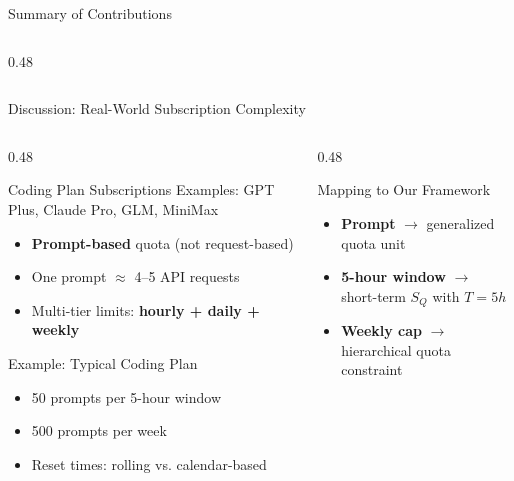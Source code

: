 \documentclass[aspectratio=169,10pt]{beamer}
\begin{document}
\begin{frame}{Summary of Contributions}
\begin{columns}[T]
\begin{column}{0.48\textwidth}
\vspace{0.3cm}
\centering
{}
\end{column}
\end{columns}
\end{frame}

\begin{frame}{Discussion: Real-World Subscription Complexity}
\begin{columns}[T]
\begin{column}{0.48\textwidth}
\begin{block}{Coding Plan Subscriptions}
Examples: GPT Plus, Claude Pro, GLM, MiniMax
\begin{itemize}
    \item \textbf{Prompt-based} quota (not request-based)
    \item One prompt $\approx$ 4--5 API requests
    \item Multi-tier limits: \textbf{hourly + daily + weekly}
\end{itemize}
\end{block}

\vspace{0.2cm}
\begin{exampleblock}{Example: Typical Coding Plan}
\begin{itemize}
    \item 50 prompts per 5-hour window
    \item 500 prompts per week
    \item Reset times: rolling vs. calendar-based
\end{itemize}
\end{exampleblock}
\end{column}

\begin{column}{0.48\textwidth}
\begin{block}{Mapping to Our Framework}
\begin{itemize}
    \item \textbf{Prompt} $\rightarrow$ generalized quota unit
    \item \textbf{5-hour window} $\rightarrow$ short-term $S_Q$ with $T=5h$
    \item \textbf{Weekly cap} $\rightarrow$ hierarchical quota constraint
\end{itemize}
\end{block}


\end{column}
\end{columns}
\end{frame}
\end{document}
